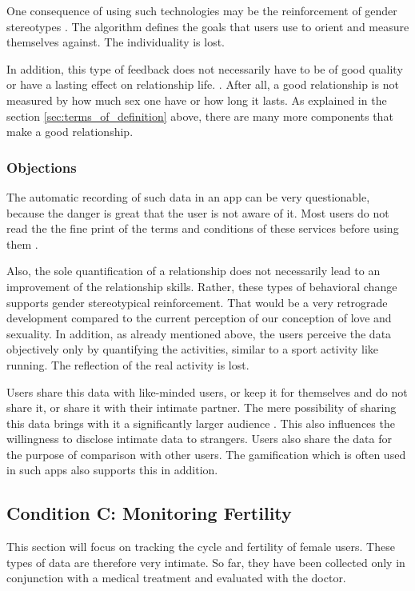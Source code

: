 One consequence of using such technologies may be the reinforcement of gender stereotypes \cite{doi:10.1080/13691058.2014.920528}. The algorithm defines the goals that users use to orient and measure themselves against. The individuality is lost.

In addition, this type of feedback does not necessarily have to be of good quality or have a lasting effect on relationship life. \cite{doi:10.1080/15265161.2017.1409823}. After all, a good relationship is not measured by how much sex one have or how long it lasts. As explained in the section \ref{sec:terms_of_definition} above, there are many more components that make a good relationship.

\subsubsection{Objections}
The automatic recording of such data in an app can be very questionable, because the danger is great that the user is not aware of it. Most users do not read the the fine print of the terms and conditions of these services before using them \cite{levy2014intimate}.

Also, the sole quantification of a relationship does not necessarily lead to an improvement of the relationship skills. Rather, these types of behavioral change supports gender stereotypical reinforcement. That would be a very retrograde development compared to the current perception of our conception of love and sexuality. %
In addition, as already mentioned above, the users perceive the data objectively only by quantifying the activities, similar to a sport activity like running. The reflection of the real activity is lost.

Users share this data with like-minded users, or keep it for themselves and do not share it, or share it with their intimate partner.
The mere possibility of sharing this data brings with it a significantly larger audience \cite{doi:10.1080/13691058.2014.920528}. This also influences the willingness to disclose intimate data to strangers.
Users also share the data for the purpose of comparison with other users. The gamification which is often used in such apps also supports this in addition.

\subsection{Condition C: Monitoring Fertility}
\label{sec:c}
This section will focus on tracking the cycle and fertility of female users. These types of data are therefore very intimate. So far, they have been collected only in conjunction with a medical treatment and evaluated with the doctor.
